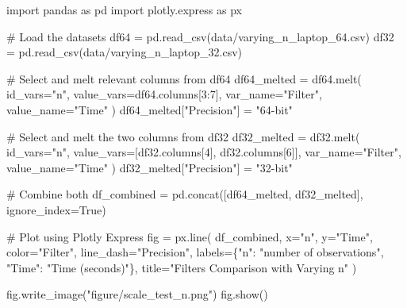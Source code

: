 \documentclass[
]{report}
\newenvironment{Shaded}{\begin{snugshade}}{\end{snugshade}}
\newcommand{\CommentTok}[1]{\textcolor[rgb]{0.37,0.37,0.37}{#1}}
\newcommand{\DecValTok}[1]{\textcolor[rgb]{0.68,0.00,0.00}{#1}}
\newcommand{\ImportTok}[1]{\textcolor[rgb]{0.00,0.46,0.62}{#1}}
\newcommand{\NormalTok}[1]{\textcolor[rgb]{0.00,0.23,0.31}{#1}}
\newcommand{\OperatorTok}[1]{\textcolor[rgb]{0.37,0.37,0.37}{#1}}
\newcommand{\StringTok}[1]{\textcolor[rgb]{0.13,0.47,0.30}{#1}}
\newcommand{\VariableTok}[1]{\textcolor[rgb]{0.07,0.07,0.07}{#1}}
\begin{document}
\begin{Shaded}
\begin{Highlighting}[]
\ImportTok{import}\NormalTok{ pandas }\ImportTok{as}\NormalTok{ pd}
\ImportTok{import}\NormalTok{ plotly.express }\ImportTok{as}\NormalTok{ px}

\CommentTok{\# Load the datasets}
\NormalTok{df64 }\OperatorTok{=}\NormalTok{ pd.read\_csv(}\StringTok{\textquotesingle{}data/varying\_n\_laptop\_64.csv\textquotesingle{}}\NormalTok{)}
\NormalTok{df32 }\OperatorTok{=}\NormalTok{ pd.read\_csv(}\StringTok{\textquotesingle{}data/varying\_n\_laptop\_32.csv\textquotesingle{}}\NormalTok{)}

\CommentTok{\# Select and melt relevant columns from df64}
\NormalTok{df64\_melted }\OperatorTok{=}\NormalTok{ df64.melt(}
\NormalTok{    id\_vars}\OperatorTok{=}\StringTok{"n"}\NormalTok{,}
\NormalTok{    value\_vars}\OperatorTok{=}\NormalTok{df64.columns[}\DecValTok{3}\NormalTok{:}\DecValTok{7}\NormalTok{],}
\NormalTok{    var\_name}\OperatorTok{=}\StringTok{"Filter"}\NormalTok{,}
\NormalTok{    value\_name}\OperatorTok{=}\StringTok{"Time"}
\NormalTok{)}
\NormalTok{df64\_melted[}\StringTok{"Precision"}\NormalTok{] }\OperatorTok{=} \StringTok{"64{-}bit"}

\CommentTok{\# Select and melt the two columns from df32}
\NormalTok{df32\_melted }\OperatorTok{=}\NormalTok{ df32.melt(}
\NormalTok{    id\_vars}\OperatorTok{=}\StringTok{"n"}\NormalTok{,}
\NormalTok{    value\_vars}\OperatorTok{=}\NormalTok{[df32.columns[}\DecValTok{4}\NormalTok{], df32.columns[}\DecValTok{6}\NormalTok{]],}
\NormalTok{    var\_name}\OperatorTok{=}\StringTok{"Filter"}\NormalTok{,}
\NormalTok{    value\_name}\OperatorTok{=}\StringTok{"Time"}
\NormalTok{)}
\NormalTok{df32\_melted[}\StringTok{"Precision"}\NormalTok{] }\OperatorTok{=} \StringTok{"32{-}bit"}

\CommentTok{\# Combine both}
\NormalTok{df\_combined }\OperatorTok{=}\NormalTok{ pd.concat([df64\_melted, df32\_melted], ignore\_index}\OperatorTok{=}\VariableTok{True}\NormalTok{)}

\CommentTok{\# Plot using Plotly Express}
\NormalTok{fig }\OperatorTok{=}\NormalTok{ px.line(}
\NormalTok{    df\_combined,}
\NormalTok{    x}\OperatorTok{=}\StringTok{"n"}\NormalTok{,}
\NormalTok{    y}\OperatorTok{=}\StringTok{"Time"}\NormalTok{,}
\NormalTok{    color}\OperatorTok{=}\StringTok{"Filter"}\NormalTok{,}
\NormalTok{    line\_dash}\OperatorTok{=}\StringTok{"Precision"}\NormalTok{,}
\NormalTok{    labels}\OperatorTok{=}\NormalTok{\{}\StringTok{"n"}\NormalTok{: }\StringTok{"number of observations"}\NormalTok{, }\StringTok{"Time"}\NormalTok{: }\StringTok{"Time (seconds)"}\NormalTok{\},}
\NormalTok{    title}\OperatorTok{=}\StringTok{"Filters Comparison with Varying n"}
\NormalTok{)}

\NormalTok{fig.write\_image(}\StringTok{"figure/scale\_test\_n.png"}\NormalTok{)}
\NormalTok{fig.show()}
\end{Highlighting}
\end{Shaded}
\end{document}
